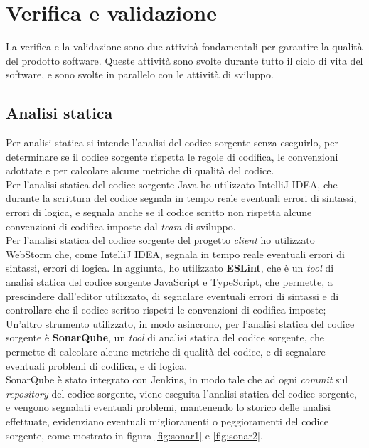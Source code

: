 \section{Verifica e validazione}
La verifica e la validazione sono due attività fondamentali per garantire la qualità del prodotto software.
Queste attività sono svolte durante tutto il ciclo di vita del software, e sono svolte in parallelo con le attività di sviluppo.
\subsection*{Analisi statica}
Per analisi statica si intende l'analisi del codice sorgente senza eseguirlo, per determinare se il codice sorgente rispetta 
le regole di codifica, le convenzioni adottate e per calcolare alcune metriche di qualità del codice.\\
Per l'analisi statica del codice sorgente Java ho utilizzato IntelliJ IDEA, che
durante la scrittura del codice segnala in tempo reale eventuali errori di sintassi, errori di logica, e segnala anche
se il codice scritto non rispetta alcune convenzioni di codifica imposte dal \textit{team} di sviluppo.\\

Per l'analisi statica del codice sorgente del progetto \textit{client} ho utilizzato WebStorm che, come IntelliJ IDEA,
segnala in tempo reale eventuali errori di sintassi, errori di logica.
In aggiunta, ho utilizzato \textbf{ESLint}, che è un \textit{tool} di analisi statica del codice sorgente JavaScript e
TypeScript, che permette, a prescindere dall'editor utilizzato, di segnalare eventuali errori di sintassi e di controllare
che il codice scritto rispetti le convenzioni di codifica imposte; \\

Un'altro strumento utilizzato, in modo asincrono, per l'analisi statica del codice sorgente è \textbf{SonarQube}, 
un \textit{tool} di analisi statica del codice sorgente, che permette di calcolare alcune metriche di qualità del codice,
e di segnalare eventuali problemi di codifica, e di logica.\\
SonarQube è stato integrato con Jenkins, in modo tale che ad ogni \textit{commit} sul \textit{repository}
del codice sorgente, viene eseguita l'analisi statica del codice sorgente, e vengono segnalati eventuali problemi, mantenendo 
lo storico delle analisi effettuate, evidenziano eventuali miglioramenti o peggioramenti del codice sorgente, come mostrato in 
figura \ref{fig:sonar1} e \ref{fig:sonar2}.\\


